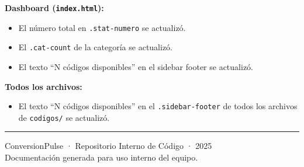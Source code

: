 \documentclass[12pt, a4paper]{article}
\newcommand{\archivo}[1]{\texttt{\textcolor{cpAccent}{#1}}}
\newcommand{\clase}[1]{\texttt{\textcolor{cpAzul}{.#1}}}
\begin{document}
\textbf{Dashboard (\archivo{index.html}):}
\begin{itemize}[leftmargin=1.5em, label={\(\square\)}]
    \item El número total en \clase{stat-numero} se actualizó.
    \item El \clase{cat-count} de la categoría se actualizó.
    \item El texto ``N códigos disponibles'' en el sidebar footer se actualizó.
\end{itemize}

\textbf{Todos los archivos:}
\begin{itemize}[leftmargin=1.5em, label={\(\square\)}]
    \item El texto ``N códigos disponibles'' en el \clase{sidebar-footer}
          de todos los archivos de \archivo{codigos/} se actualizó.
\end{itemize}


\vspace{2cm}
\noindent\textcolor{cpAccent}{\rule{\linewidth}{0.6pt}}

\vspace{0.5cm}
\begin{center}
    {\small\color{cpTextoClaro}
    ConversionPulse · Repositorio Interno de Código · 2025 \\[4pt]
    Documentación generada para uso interno del equipo.}
\end{center}
\end{document}

